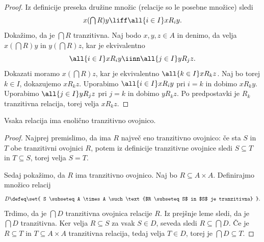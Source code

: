 \begin{proof}
  Iz definicije preseka družine množic (relacije so le posebne množice) sledi
  \begin{equation*}
  x (\textstyle\bigcap R) y \liff \all{i \in I} x R_i y.
  \end{equation*}
  Dokažimo, da je $\textstyle\bigcap R$ tranzitivna.
  Naj bodo $x, y, z \in A$ in denimo, da velja
  $x (\textstyle\bigcap R) y$ in $y (\textstyle\bigcap R) z$, kar je ekvivalentno
  \begin{equation*}
    \all{i \in I} x R_i y
    \iinn
    \all{j \in I} y R_j z.
  \end{equation*}
  Dokazati moramo $x (\textstyle\bigcap R) z$, kar je ekvivalentno
  $\all{k \in I} x R_k z$.
  Naj bo torej $k \in I$, dokazujemo $x R_k z$. Uporabimo $\all{i \in I} x R_i y$ pri $i = k$ in dobimo $x R_k y$.
  Uporabimo $\all{j \in I} y R_j z$ pri $j = k$ in dobimo $y R_k z$.
  Po predpostavki je $R_k$ tranzitivna relacija, torej velja $x R_k z$.
\end{proof}

\begin{izrek}
  Vsaka relacija ima enolično tranzitivno ovojnico.
\end{izrek}

\begin{proof}
  Najprej premislimo, da ima $R$ največ eno tranzitivno ovojnico: če sta
  $S$ in $T$ obe tranzitivni ovojnici $R$, potem iz definicije tranzitivne ovojnice
  sledi $S \subseteq T$ in $T \subseteq S$, torej velja $S = T$.

  Sedaj pokažimo, da $R$ ima tranzitivno ovojnico. Naj bo $R \subseteq A \times A$. Definirajmo množico relacij
  \begin{equation*}
    D \defeq \set{ S \subseteq A \times A \such \text{$R \subseteq S$ in $S$ je tranzitivna} }.
  \end{equation*}
  Trdimo, da je $\textstyle\bigcap D$ tranzitivna ovojnica relacije $R$.
  Iz prejšnje leme sledi, da je $\textstyle\bigcap D$ tranzitivna.
  Ker velja $R \subseteq S$ za vsak $S \in D$, seveda sledi $R \subseteq \textstyle\bigcap D$.
  Če je $R \subseteq T$ in $T \subseteq A \times A$ tranzitivna relacija, tedaj velja $T \in D$, torej je $\bigcap D \subseteq T$.
\end{proof}


